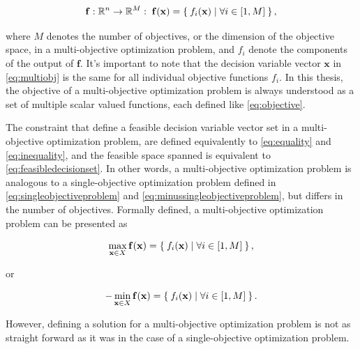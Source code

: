 \begin{equation}
\label{eq:multiobj}
    \mathbf{f}: \mathbb{R}^n \to \mathbb{R}^M:\; \mathbf{f}(\mathbf{x}) = \Set{f_i(\mathbf{x})\mid\forall i \in [1, M]},
\end{equation}

where $M$ denotes the number of objectives, or the dimension of the objective space, in a multi-objective optimization
problem, and $f_i$ denote the components of the output of $\mathbf{f}$.
It's important to note that the decision variable vector $\mathbf{x}$ in \eqref{eq:multiobj} is the same for all
individual objective functions $f_i$. In this thesis, the objective of a multi-objective optimization problem is always understood
as a set of multiple scalar valued functions, each defined like \eqref{eq:objective}.

The constraint that define a feasible decision variable vector set in a multi-objective optimization problem, are defined equivalently
to \eqref{eq:equality} and \eqref{eq:inequality}, and the feasible space spanned is equivalent to \eqref{eq:feasibledecisionset}.
In other words, a multi-objective optimization problem is analogous to a single-objective optimization problem defined in 
\eqref{eq:singleobjectiveproblem} and \eqref{eq:minussingleobjectiveproblem}, but differs in the number of objectives.
Formally defined, a multi-objective optimization problem can be presented as

\begin{equation}
    \label{eq:multiobjectiveproblem}
    \max_{\mathbf{x}\in X} \mathbf{f}(\mathbf{x}) = \Set{f_i(\mathbf{x})\mid\forall i \in [1, M]},
\end{equation}

or

\begin{equation}
    \label{eq:minusmultiobjectiveproblem}
    -\min_{\mathbf{x}\in X} \mathbf{f}(\mathbf{x}) = \Set{f_i(\mathbf{x})\mid\forall i \in [1, M]}.
\end{equation}

However, defining a solution for a multi-objective optimization problem is not as straight forward as it was in the
case of a single-objective optimization problem.

